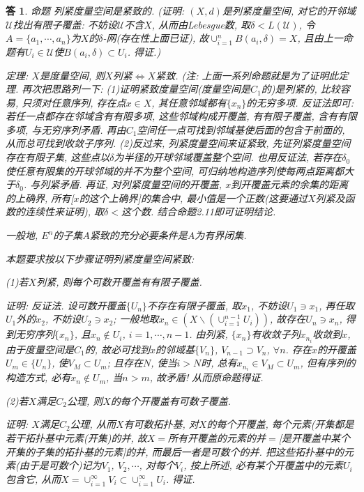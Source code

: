 \documentclass{ctexart}%
\newtheorem*{solution}{答}
\theoremstyle{definition}
\theoremstyle{remark}
\begin{document}
\begin{solution}
命题 列紧度量空间是紧致的. (证明: $(X,d)$是列紧度量空间, 对它的开邻域$\mathscr{U}$找出有限子覆盖: 不妨设$\mathscr{U}$不含$X$, 从而由Lebesgue数, 取$\delta<L(\mathscr{U})$, 令$A=\{a_1,\cdots,a_n\}$为$X$的$\delta$-网(存在性上面已证), 故$\cup_{i=1}^nB(a_i,\delta)=X$, 且由上一命题有$U_i\in \mathscr{U}$使$B(a_i,\delta)\subset U_i$. 得证.)

定理: $X$是度量空间, 则$X$列紧$\Longleftrightarrow X$紧致. (注: 上面一系列命题就是为了证明此定理. 再次把思路列一下: (1)证明紧致度量空间(度量空间是$C_1$的)是列紧的, 比较容易, 只须对任意序列, 存在点$x\in X$, 其任意邻域都有$\{x_n\}$的无穷多项. 反证法即可: 若任一点都存在邻域含有有限多项, 这些邻域构成开覆盖, 有有限子覆盖, 含有有限多项, 与无穷序列矛盾. 再由$C_1$空间任一点可找到邻域基使后面的包含于前面的, 从而总可找到收敛子序列. (2)反过来, 列紧度量空间来证紧致, 先证列紧度量空间存在有限子集, 这些点以$\delta$为半径的开球邻域覆盖整个空间. 也用反证法, 若存在$\delta_0$使任意有限集的开球邻域的并不为整个空间, 可归纳地构造序列使每两点距离都大于$\delta_0$. 与列紧矛盾. 再证, 对列紧度量空间的开覆盖, $x$到开覆盖元素的余集的距离的上确界, 所有[$x$的这个上确界]的集合中, 最小值是一个正数(这要通过$X$列紧及函数的连续性来证明), 取$\delta<$这个数. 结合命题2.11即可证明结论. 

一般地, $E^n$的子集$A$紧致的充分必要条件是$A$为有界闭集. 

本题要求按以下步骤证明列紧度量空间紧致: 

\textsl{(1)若$X$列紧, 则每个可数开覆盖有有限子覆盖.}

证明: 反证法. 设可数开覆盖$\{U_n\}$不存在有限子覆盖, 取$x_1$, 不妨设$U_1\ni x_1$, 再任取$U_1$外的$x_2$, 不妨设$U_2\ni x_2$; 一般地取$x_n\in (X\backslash (\cup_{i=1}^{n-1} U_i))$, 故存在$U_n\ni x_n$, 得到无穷序列$\{x_n\}$, 且$x_n\notin U_i$, $i=1,\cdots, n-1$. 由列紧, $\{x_n\}$有收敛子列$x_{n_i}$收敛到$x$, 由于度量空间是$C_1$的, 故必可找到$x$的邻域基$\{V_n\}$, $V_{n-1}\supset V_n$, $\forall n$. 存在$x$的开覆盖$U_m\in \{U_n\}$,  使$V_M\subset U_m$; 且存在$N$, 使当$i>N$时, 总有$x_{n_i}\in V_M\subset U_m$, 但有序列的构造方式, 必有$x_n\notin U_m$, 当$n>m$, 故矛盾! 从而原命题得证. 

\textsl{(2)若$X$满足$C_2$公理, 则$X$的每个开覆盖有可数子覆盖.}

证明: $X$满足$C_2$公理, 从而$X$有可数拓扑基, 对$X$的每个开覆盖, 每个元素(开集都是若干拓扑基中元素(开集)的并, 故$X=$所有开覆盖的元素的并$=$[是开覆盖中某个开集的子集的拓扑基的元素]的并, 而最后一者是可数个的并. 把这些拓扑基中的元素(由于是可数个)记为$V_1$, $V_2,\cdots$, 对每个$V_i$, 按上所述, 必有某个开覆盖中的元素$U_i$包含它, 从而$X=\cup_{i=1}^\infty V_i \subset \cup _{i=1}^\infty U_i$. 得证.


\end{solution}
\end{document}

